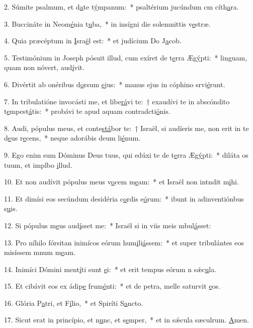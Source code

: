 2. Súmite psalmum, et d\uline{a}te t\uline{ý}mpanum:~* psaltérium jucúndum cm cíth\uline{a}ra.\par 
3. Buccináte in Neom\uline{é}nia t\uline{u}ba,~* in insígni die solemnittis v\uline{e}stræ.\par 
4. Quia præcéptum in \uline{I}sra\uline{ë}l est:~* et judícium Do J\uline{a}cob.\par 
5. Testimónium in Joseph pósuit illud, cum exíret de t\uline{e}rra Æg\uline{ý}pti:~* linguam, quam non nóvert, aud\uline{í}vit.\par 
6. Divértit ab onéribus d\uline{o}rsum \uline{e}jus:~* manus ejus in cóphino srvi\uline{é}runt.\par 
7. In tribulatióne invocásti me, et libe\uline{rá}vi te:~† exaudívi te in abscóndito t\uline{e}mpest\uline{á}tis:~* probávi te apud aquam contradcti\uline{ó}nis.\par 
8. Audi, pópulus meus, et conte\uline{stá}bor te:~† Israël, si audíeris me, non erit in te d\uline{e}us r\uline{e}cens,~* neque adorábis deum li\uline{é}num.\par 
9. Ego enim sum Dóminus Deus tuus, qui edúxi te de t\uline{e}rra Æg\uline{ý}pti:~* diláta os tuum, et implbo \uline{i}llud.\par 
10. Et non audívit pópulus meus v\uline{o}cem m\uline{e}am:~* et Israël non intndit m\uline{i}hi.\par 
11. Et dimísi eos secúndum desidéria c\uline{o}rdis e\uline{ó}rum:~* ibunt in adinventiónbus s\uline{u}is.\par 
12. Si pópulus m\uline{e}us aud\uline{í}sset me:~* Israël si in viis meis mbul\uline{á}sset:\par 
13. Pro níhilo fórsitan inimícos eórum hum\uline{i}li\uline{á}ssem:~* et super tribulántes eos misíssem mnum m\uline{e}am.\par 
14. Inimíci Dómini ment\uline{í}ti sunt \uline{e}i:~* et erit tempus eórum n sǽc\uline{u}la.\par 
15. Et cibávit eos ex ádip\uline{e} frum\uline{é}nti:~* et de petra, melle saturvit \uline{e}os.\par 
16. Glória P\uline{a}tri, et F\uline{í}lio,~* et Spiríti S\uline{a}ncto.\par 
17. Sicut erat in princípio, et n\uline{u}nc, et s\uline{e}mper,~* et in sǽcula sæculrum. \uline{A}men.\par 
